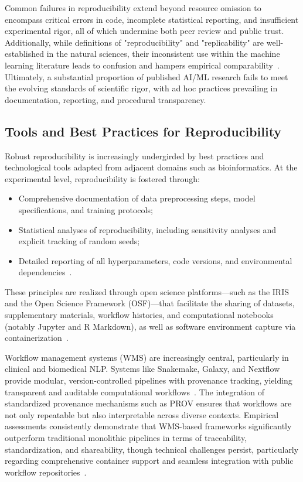 \documentclass[sigconf]{acmart}
\begin{document}
Common failures in reproducibility extend beyond resource omission to encompass critical errors in code, incomplete statistical reporting, and insufficient experimental rigor, all of which undermine both peer review and public trust. Additionally, while definitions of "reproducibility" and "replicability" are well-established in the natural sciences, their inconsistent use within the machine learning literature leads to confusion and hampers empirical comparability~\cite{ref108}. Ultimately, a substantial proportion of published AI/ML research fails to meet the evolving standards of scientific rigor, with ad hoc practices prevailing in documentation, reporting, and procedural transparency.

\subsection{Tools and Best Practices for Reproducibility}

Robust reproducibility is increasingly undergirded by best practices and technological tools adapted from adjacent domains such as bioinformatics. At the experimental level, reproducibility is fostered through:

\begin{itemize}
  \item Comprehensive documentation of data preprocessing steps, model specifications, and training protocols;
  \item Statistical analyses of reproducibility, including sensitivity analyses and explicit tracking of random seeds;
  \item Detailed reporting of all hyperparameters, code versions, and environmental dependencies~\cite{ref108}.
\end{itemize}

These principles are realized through open science platforms---such as the IRIS and the Open Science Framework (OSF)---that facilitate the sharing of datasets, supplementary materials, workflow histories, and computational notebooks (notably Jupyter and R Markdown), as well as software environment capture via containerization~\cite{ref108}.

Workflow management systems (WMS) are increasingly central, particularly in clinical and biomedical NLP. Systems like Snakemake, Galaxy, and Nextflow provide modular, version-controlled pipelines with provenance tracking, yielding transparent and auditable computational workflows~\cite{ref12,ref13,ref24,ref25,ref28,ref29,ref32,ref33,ref34,ref39,ref44,ref46,ref50,ref58,ref65}. The integration of standardized provenance mechanisms such as PROV ensures that workflows are not only repeatable but also interpretable across diverse contexts. Empirical assessments consistently demonstrate that WMS-based frameworks significantly outperform traditional monolithic pipelines in terms of traceability, standardization, and shareability, though technical challenges persist, particularly regarding comprehensive container support and seamless integration with public workflow repositories~\cite{ref65}.
\end{document}
